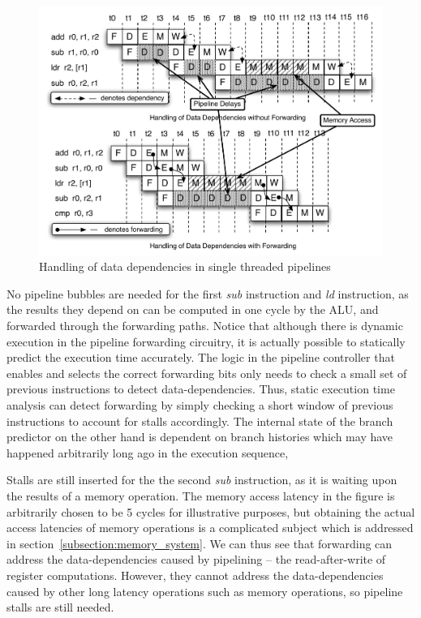 \begin{figure}
\vspace{-20pt}
\begin{center}
\includegraphics[scale=.6]{figs/data_depend_execution_non_interleaved}
\end{center}
\vspace{-10pt}
\caption{Handling of data dependencies in single threaded pipelines}
\label{fig:data_depend_execution_non_interleaved}
\end{figure}
No pipeline bubbles are needed for the first \emph{sub} instruction and \emph{ld} instruction, as the results they depend on can be computed in one cycle by the ALU, and forwarded through the forwarding paths.
Notice that although there is dynamic execution in the pipeline forwarding circuitry, it is actually possible to statically predict the execution time accurately.
The logic in the pipeline controller that enables and selects the correct forwarding bits only needs to check a small set of previous instructions to detect data-dependencies. 
Thus, static execution time analysis can detect forwarding by simply checking a short window of previous instructions to account for stalls accordingly. 
The internal state of the branch predictor on the other hand is dependent on branch histories which may have happened arbitrarily long ago in the execution sequence,

Stalls are still inserted for the the second \emph{sub} instruction, as it is waiting upon the results of a memory operation. 
The memory access latency in the figure is arbitrarily chosen to be 5 cycles for illustrative purposes, but obtaining the actual access latencies of memory operations is a complicated subject which is addressed in section~\ref{subsection:memory_system}.
We can thus see that forwarding can address the data-dependencies caused by pipelining -- the read-after-write of register computations. 
However, they cannot address the data-dependencies caused by other long latency operations such as memory operations, so pipeline stalls are still needed. 
 
